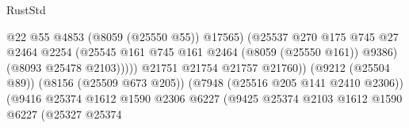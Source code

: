 \begin{lexlean}{RustStd}
\begin{coremodule}
                                                            @22
                                                            @55
                                                            @4853
                                                            (@8059 (@25550 @55))
                                                            @17565)
                                                          (@25537
                                                            @270
                                                            @175
                                                            @745
                                                            @27
                                                            @2464
                                                            @2254
                                                            (@25545
                                                              @161
                                                              @745
                                                              @161
                                                              @2464
                                                              (@8059 (@25550 @161))
                                                              @9386)
                                                            (@8093 @25478 @2103)))))
                                                    @21751
                                                    @21754
                                                    @21757
                                                    @21760))
                                                (@9212 (@25504 @89))
                                                (@8156 (@25509 @673 @205))
                                                (@7948 (@25516 @205 @141 @2410 @2306))
                                                (@9416
                                                  @25374
                                                  @1612
                                                  @1590
                                                  @2306
                                                  @6227
                                                  (@9425
                                                    @25374
                                                    @2103
                                                    @1612
                                                    @1590
                                                    @6227
                                                    (@25327
                                                      @25374

\end{coremodule}
\end{lexlean}
